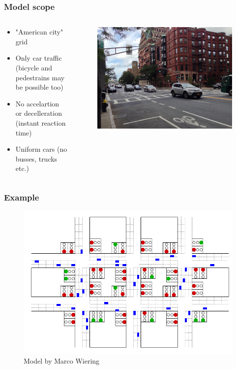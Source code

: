 \documentclass[11pt]{beamer}
\begin{document}
\begin{frame}
\frametitle{Model scope}
\begin{columns}
    \begin{column}{.5\textwidth}
        \begin{itemize}
            \item "American city" grid
            \item Only car traffic (bicycle and pedestrains may be possible too)
            \item No accelartion or decelleration (instant reaction time)
            \item Uniform cars (no busses, trucks etc.)
        \end{itemize}
    \end{column}
    \begin{column}{.5\textwidth}
        \begin{figure}
        \centering
        \includegraphics[scale=.05]{boston.jpg}
        \end{figure}
    \end{column}
\end{columns}
\end{frame}

\begin{frame}
\frametitle{Example}

\begin{figure}
\centering
\includegraphics[width=.8\textwidth]{wieringmodel.png}
\caption{Model by Marco Wiering}
\end{figure}
  
\end{frame}
\end{document}
